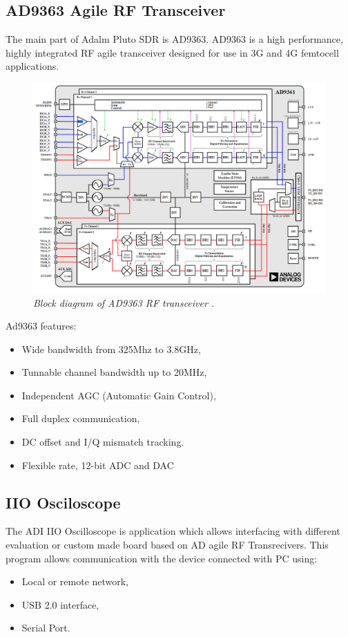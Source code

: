 \documentclass[en,printmode]{mgr}
\begin{document}
		\subsection*{AD9363 Agile RF Transceiver}
			The main part of Adalm Pluto SDR is AD9363.  AD9363 is a high performance, highly
			integrated RF agile transceiver designed for use in 3G and 4G femtocell applications.
			
			\begin{figure}[!htb]
    			\centering
   				\includegraphics[width=\textwidth]{images/ad9361_sch.png}
   		 		\caption{\textit{Block diagram of AD9363 RF transceiver \cite{ad9363_diag}.}}
			\end{figure}
			
			Ad9363 features:
			\begin{itemize}
				\item Wide bandwidth from 325Mhz to 3.8GHz,
				\item Tunnable channel bandwidth up to 20MHz,
				\item Independent AGC (Automatic Gain Control),
				\item Full duplex communication,
				\item DC offset and I/Q mismatch tracking.
				\item Flexible rate, 12-bit ADC and DAC
			\end{itemize}
		\subsection*{IIO Osciloscope}
			The ADI IIO Oscilloscope is application which allows interfacing with different
			evaluation or custom made board based on AD agile RF Transrecivers. This program allows
			communication with the device connected with PC
			using:
			\begin{itemize}
				\item Local or remote network,
				\item USB 2.0 interface,
				\item Serial Port.
			\end{itemize}			 
			
\end{document}
